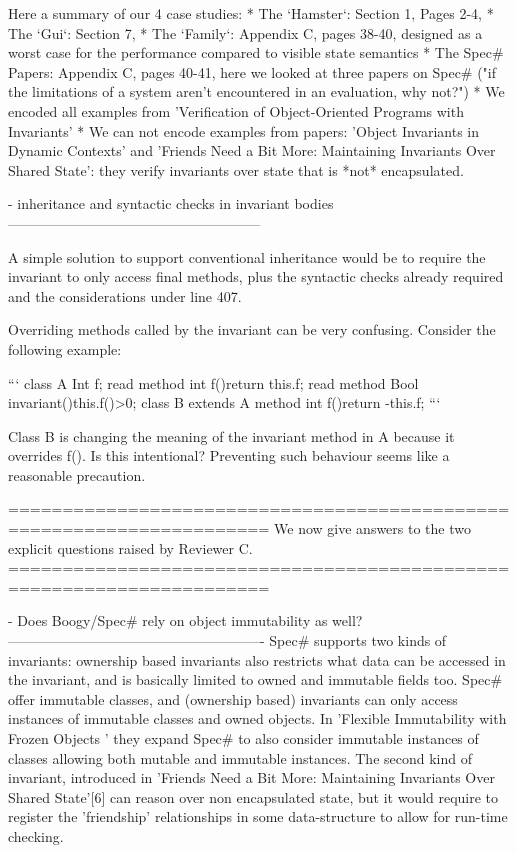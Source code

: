 Here a summary of our 4 case studies:
* The `Hamster`: Section 1, Pages 2-4, 
* The `Gui`: Section 7,
* The `Family`: Appendix C, pages 38-40,
  designed as a worst case for the performance compared to visible state semantics
* The Spec# Papers: Appendix C, pages 40-41,
  here we looked at three papers on Spec# ("if the limitations of a system aren't encountered in an evaluation, why not?")
 *  We encoded all examples from 'Verification of Object-Oriented Programs with Invariants'
 *  We can not encode examples from  papers: 'Object Invariants in Dynamic Contexts' and
   'Friends Need a Bit More: Maintaining Invariants Over Shared State':
   they verify invariants over state that is *not* encapsulated.


- inheritance and syntactic checks in invariant bodies
------------------------------------------------------

A simple solution to support conventional inheritance would be to require the invariant to only
access final methods,
plus the syntactic checks already required and the considerations under line 407.

Overriding methods called by the invariant can be very confusing.
Consider the following example:

```
class A{
  Int f;
  read method int f(){return this.f;}
  read method Bool invariant(){this.f()>0;}
}
class B extends A {
  method int f(){return -this.f;}
}
```

Class B is changing the meaning of the invariant method in A because it overrides f().
Is this intentional? Preventing such behaviour seems like a reasonable precaution.


======================================================================
We now give answers to the two explicit questions raised by Reviewer C.
======================================================================


- Does Boogy/Spec# rely on object immutability as well?
-------------------------------------------------------
Spec# supports two kinds of invariants:  ownership based invariants
 also restricts what data can be accessed in the invariant, and is basically limited
to owned and immutable fields too.
Spec# offer immutable classes, and (ownership based) invariants can only access instances of
immutable classes and owned objects. In 'Flexible Immutability with Frozen Objects
' they expand Spec# to also
consider immutable instances of classes allowing both mutable and immutable instances.
The second kind of invariant, introduced in 
'Friends Need a Bit More: Maintaining Invariants Over Shared State'[6]
 can reason over non encapsulated state, but it would
require to register the 'friendship' relationships in some data-structure
to allow for run-time checking.


